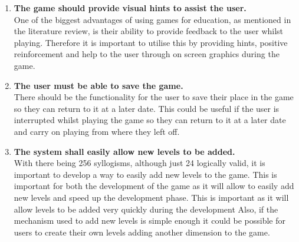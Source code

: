 \documentclass[12pt,a4paper]{report}
\begin{document}
\begin{enumerate}[label*=\arabic*]
            
            	  \item \textbf{The game should provide visual hints to assist the user.}\\
One of the biggest advantages of using games for education, as mentioned in the literature review, is their ability to provide feedback to the user whilst playing. Therefore it is important to utilise this by providing hints, positive reinforcement and help to the user through on screen graphics during the game.

            	  \item \textbf{The user must be able to save the game.}\\
There should be the functionality for the user to save their place in the game so they can return to it at a later date. This could be useful if the user is interrupted whilst playing the game so they can return to it at a later date and carry on playing from where they left off.
            
                        	  \item \textbf{The system shall easily allow new levels to be added.}\\
With there being 256 syllogisms, although just 24 logically valid, it is important to develop a way to easily add new levels to the game. This is important for both the development of the game as it will allow to easily add new levels and speed up the development phase. This is important as it will allow levels to be added very quickly during the development Also, if the mechanism used to add new levels is simple enough it could be possible for users to create their own levels adding another dimension to the game.

            
            
        \end{enumerate}
        
\end{document}
